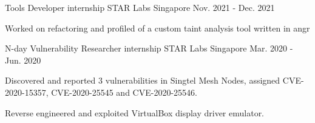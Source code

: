 \begin{cventries}
  \cventry
    {Tools Developer internship} %
    {STAR Labs} %
    {Singapore} %
    {Nov. 2021 - Dec. 2021} %
    {
      \begin{cvitems} %
        \item {Worked on refactoring and profiled of a custom taint analysis tool written in angr}
      \end{cvitems}
    }

  \cventry
    {N-day Vulnerability Researcher internship} %
    {STAR Labs} %
    {Singapore} %
    {Mar. 2020 - Jun. 2020} %
    {
      \begin{cvitems} %
        \item {Discovered and reported 3 vulnerabilities in Singtel Mesh Nodes, assigned CVE-2020-15357, CVE-2020-25545 and CVE-2020-25546.}
        \item {Reverse engineered and exploited VirtualBox display driver emulator.}
      \end{cvitems}
    }


\end{cventries}
